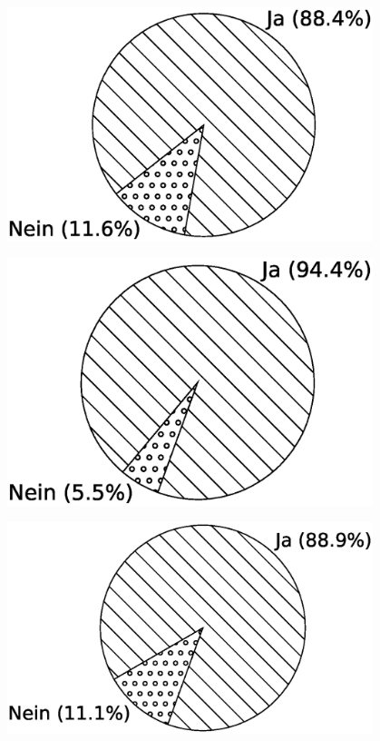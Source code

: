 \begin{minipage}{0.45\textwidth}
  \centering  
  \includegraphics[width=0.8\textwidth]{img/pi_standard_total.eps}
  \label{Chap:Eval-Sec:Stand-Fig:Total}
\end{minipage}
\hfill
\begin{minipage}{0.45\textwidth}
  \centering
  \includegraphics[width=0.8\textwidth]{img/pi_standard_mutex.eps}
  \label{Chap:Eval-Sec:Stand-Fig:Mutex}
\end{minipage}
\begin{minipage}{0.45\textwidth}
  \centering  
  \includegraphics[width=0.8\textwidth]{img/pi_standard_channel.eps}
  \label{Chap:Eval-Sec:Stand-Fig:Channel}
\end{minipage}
